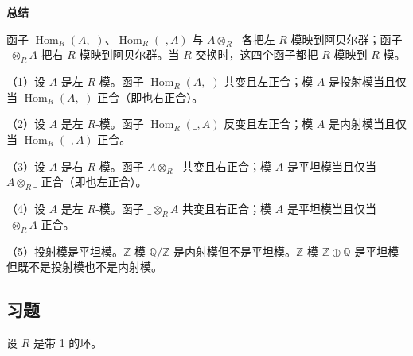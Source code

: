 \noindent\textbf{总结}

函子 \(\operatorname{Hom}_R(A, \_)\)、\(\operatorname{Hom}_R(\_, A)\) 与 \(A \otimes_R \_\) 各把左 \(R\)-模映到阿贝尔群；函子 \(\_ \otimes_R A\) 把右 \(R\)-模映到阿贝尔群。当 \(R\) 交换时，这四个函子都把 \(R\)-模映到 \(R\)-模。

（1）设 \(A\) 是左 \(R\)-模。函子 \(\operatorname{Hom}_R(A, \_)\) 共变且左正合；模 \(A\) 是投射模当且仅当 \(\operatorname{Hom}_R(A, \_)\) 正合（即也右正合）。

（2）设 \(A\) 是左 \(R\)-模。函子 \(\operatorname{Hom}_R(\_, A)\) 反变且左正合；模 \(A\) 是内射模当且仅当 \(\operatorname{Hom}_R(\_, A)\) 正合。

（3）设 \(A\) 是右 \(R\)-模。函子 \(A \otimes_R \_\) 共变且右正合；模 \(A\) 是平坦模当且仅当 \(A \otimes_R \_\) 正合（即也左正合）。

（4）设 \(A\) 是左 \(R\)-模。函子 \(\_ \otimes_R A\) 共变且右正合；模 \(A\) 是平坦模当且仅当 \(\_ \otimes_R A\) 正合。

（5）投射模是平坦模。\(\mathbb{Z}\)-模 \(\mathbb{Q}/\mathbb{Z}\) 是内射模但不是平坦模。\(\mathbb{Z}\)-模 \(\mathbb{Z} \oplus \mathbb{Q}\) 是平坦模但既不是投射模也不是内射模。

\subsection*{习题}

\noindent 设 \(R\) 是带 1 的环。


